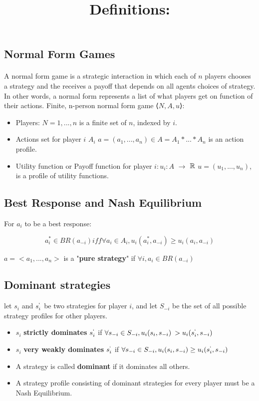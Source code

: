 \subsection{Normal Form Games}
\paragraph{}A normal form game is a strategic interaction in which each of $n$ players chooses a strategy and the receives a payoff that depends on all agents choices of strategy. In other words, a normal form represents a list of what players get on function of their actions.
Finite, n-person normal form game  ⟨$N, A, u$⟩:
\begin{itemize}
\item Players: $ N = {1, ... , n} $ is a finite set of $n$, indexed by $i$.
\item Actions set for player $i$ $A_i$
\subitem $a = (a_1,...,a_n) \in A = A_1 * ... * A_n $ is an action profile.
\item Utility function or Payoff function for player $i: u_i : A $  $\to$ ${\Bbb{R}}$
\subitem $u = (u_1,..., u_n)$, is a profile of utility functions.
\end{itemize}

\subsection{Best Response and Nash Equilibrium}\label{subsection}
For $a_i$ to be a best response:
\begin{mydef}\label{def:def1500}
\begin{equation}\label{eq:1666}
 a_i^* \in BR(a_{-i})  iff   \forall a_i \in A_i, u_i(a_i^*,a_{-i}) \geq u_i(a_i, a_{-i})
\end{equation}
\end{mydef}
\begin{mydef}\label{def:def1500}

$a = <a_1,...,a_n>$ is a "\textbf{pure strategy}" if $\forall i, a_i \in BR(a_{-i})$
\end{mydef}

\subsection{Dominant strategies}
let $s_i$ and $s_i^`$ be two strategies for player $i$, and let $S_{-i}$ be the set of all possible strategy profiles for other players.
\bigbreak
\title{\textbf{Definitions:} }
\begin{itemize}
\item $s_i$ \textbf{strictly dominates} $s_i^`$ if $\forall s_{-i} \in S_{-i}, u_i(s_i, s_{-i}) \>> u_i(s_i^`, s_{-i})$
\item $s_i$ \textbf{very weakly dominates} $s_i^`$ if $\forall s_{-i} \in S_{-i}, u_i(s_i, s_{-i}) \geq u_i(s_i^`, s_{-i})$
\item A strategy is called \textbf{dominant} if it dominates all others.
\item A strategy profile consisting of dominant strategies for every player must be a Nash Equilibrium.
\end{itemize}

